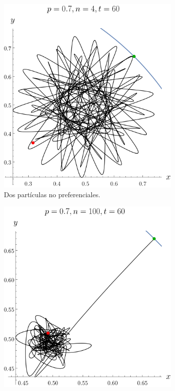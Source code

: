 \begin{figure}[ht!]
    \centering
    \begin{subfigure}{0.5\textwidth}
      \centering
      \includegraphics[width=0.9\linewidth]{chapter3/figures_separable/local_Z_evol_n=4_p=0.7_from_-3_to_3_end=60.png}
      \caption{Dos partículas no preferenciales.}
    \end{subfigure}%
    \begin{subfigure}{0.5\textwidth}
      \centering
      \includegraphics[width=0.9\linewidth]{chapter3/figures_separable/local_Z_evol_n=100_p=0.7_from_-3_to_3_end=60.png}

\end{subfigure}
\end{figure}
